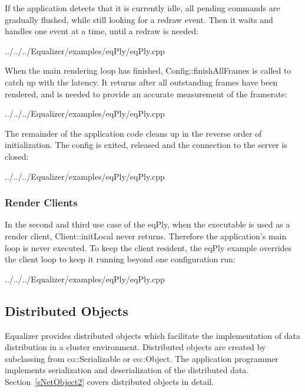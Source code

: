 \documentclass[10pt,a4]{scrartcl}
\newcommand{\sref}[1]{Section~\ref{#1}}
\begin{document}
If the application detects that it is currently idle, all pending
commands are gradually flushed, while still looking for a redraw
event. Then it waits and handles one event at a time, until a redraw is
needed:

{\footnotesize
  {../../../Equalizer/examples/eqPly/eqPly.cpp}}

When the main rendering loop has finished,
\textsf{Config::finishAllFrames} is called to catch up with the
latency. It returns after all outstanding frames have been rendered, and
is needed to provide an accurate measurement of the framerate:

{\footnotesize
  {../../../Equalizer/examples/eqPly/eqPly.cpp}}

The remainder of the application code cleans up in the reverse order of
initialization. The config is exited, released and the connection to the server
is closed:

{\footnotesize
  {../../../Equalizer/examples/eqPly/eqPly.cpp}}

\subsubsection{Render Clients}

In the second and third use case of the \textsf{eqPly}, when the
executable is used as a render client, \textsf{Client::initLocal} never
returns. Therefore the application's main loop is never executed. To
keep the client resident, the \textsf{eqPly} example overrides the
client loop to keep it running beyond one configuration run:

{\footnotesize
  {../../../Equalizer/examples/eqPly/eqPly.cpp}}


\subsection{\label{sNetObject}Distributed Objects}

Equalizer provides distributed objects which facilitate the implementation of
data distribution in a cluster environment. Distributed objects are created by
subclassing from \textsf{co::Serializable} or \textsf{co::Object}. The
application programmer implements serialization and deserialization of the
distributed data. \sref{sNetObject2} covers distributed objects in detail.
\end{document}
